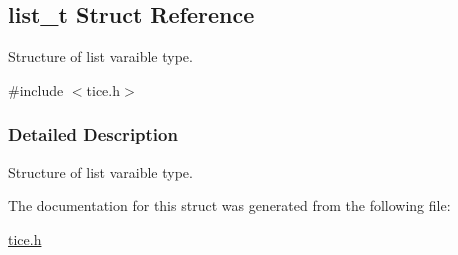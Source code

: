 \hypertarget{structlist__t}{}\subsection{list\+\_\+t Struct Reference}
\label{structlist__t}


Structure of list varaible type.  




{\ttfamily \#include $<$tice.\+h$>$}



\subsubsection{Detailed Description}
Structure of list varaible type. 

The documentation for this struct was generated from the following file\+:\begin{DoxyCompactItemize}
\item 
\hyperlink{tice_8h}{tice.\+h}\end{DoxyCompactItemize}
